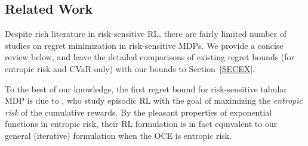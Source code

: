 \documentclass[11pt]{article}
\newcommand{\1}{\mathbbm{1}}
\newcommand{\gao}[1]{\textcolor{blue}{{#1}}} %
\begin{document}




    

\subsection{Related Work}

Despite rich literature in risk-sensitive RL, there are fairly limited number of studies on regret minimization in risk-sensitive MDPs. We provide a concise review below, and leave the detailed comparisons of existing regret bounds (for entropic risk and CVaR only) with our bounds to Section~\ref{SECEX}. 



To the best of our knowledge, the first regret bound for risk-sensitive tabular MDP is due to \cite{fei2020risk}, who study episodic RL with the goal of maximizing the \textit{entropic risk} of the cumulative rewards. By the pleasant properties of exponential functions in entropic risk, their RL formulation is in fact equivalent to our general (iterative) formulation when the OCE is entropic risk. 
\end{document}
